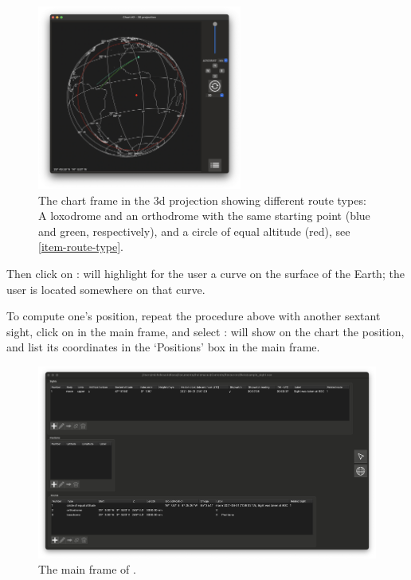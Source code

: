 \documentclass{ol-softwaremanual}
\begin{document}
  \begin{figure}
    \includegraphics[width=0.6\textwidth]{figures/route-types.png}
    \caption{
      \label{fig-route-types}
      The chart frame in the 3d projection showing different route types: A loxodrome and an orthodrome with the same starting point (blue and green, respectively), and a circle of equal altitude (red), see \cref{item-route-type}. 
    }
    \end{figure}

  Then click on : \thel will highlight for the user a curve on the surface of the Earth; the user is located somewhere on that curve. 

To compute one's position, repeat the procedure above with another sextant \gls{sight}, click on  in the main frame, and select : \thel will show on the chart the position, and list its coordinates in the `Positions' box in the main frame. 

\begin{figure}
  \centering
  \includegraphics[width=1\textwidth]{figures/list-frame.png}
  \caption{
    \label{fig-list-frame}
    The main frame of \thel. 
  }
  \end{figure}
\end{document}
